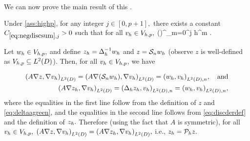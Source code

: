
We can now prove the main result of this .

\label{lem:negdiscsum}
Under \cref{ass:highp}, for any integer $j \in [0,p+1],$ there exists a constant $\Csumj > 0$ such that for all $v_{h} \in V_{h,p},$
\beq\label{eq:negdiscsum}
 \leq \Csumj\mleft(\En\nvar\mright)^{}\nmax \sum_{m=0}^j h^{m} .
\eeq
\ele

Let $w_{h} \in V_{h,p},$ and define $z_{h} = \Delta_{h}^{-1} w_{h}$ and $z = \mathcal S_{n} w_{h}$ (observe $z$ is well-defined as $\Vhp \subseteq \LtD$). Then, for all $v_{h} \in V_{h,p}$, we have

\begin{align*}
\IPLtD{A \grad z}{\grad \vh} = \IPLtD{A \grad \mleft(\sdsol \wh\mright)}{\grad \vh} = \IPLtDn{\wh}{\vh},\quad \text{and}\\
\IPLtD{A \grad \zh}{\grad \vh} = \IPLtDn{\Deltah \zh}{\vh} = \IPLtDn{\wh}{\vh},
\end{align*}
where the equalities in the first line follow from the definition of $z$ and \cref{eq:deltaagreen}, and the equalities in the second line follows from \cref{eq:discderdef} and the definition of $z_{h}.$  Therefore (using the fact that $A$ is symmetric), for all $v_{h} \in V_{h,p},$ $\IPLtD{A\grad z}{\grad \vh} = \IPLtD{A\grad \zh}{\grad \vh},$ i.e., $z_{h} = \mathcal P_{h} z.$

